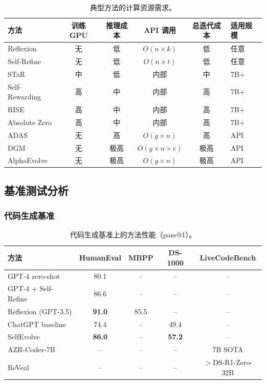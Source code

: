 \begin{table}[htbp]
\centering
\caption{典型方法的计算资源需求。}
\label{tab:compute-cost}
\begin{tabular}{lccccl}
\toprule
\textbf{方法} & \textbf{训练 GPU} & \textbf{推理成本} & \textbf{API 调用} & \textbf{总迭代成本} & \textbf{适用规模} \\
\midrule
Reflexion & 无 & 低 & $O(n \times k)$ & 低 & 任意 \\
Self-Refine & 无 & 低 & $O(n \times t)$ & 低 & 任意 \\
STaR & 中 & 低 & 内部 & 中 & 7B+ \\
Self-Rewarding & 高 & 中 & 内部 & 高 & 7B+ \\
RISE & 高 & 中 & 内部 & 高 & 7B+ \\
Absolute Zero & 高 & 中 & 内部 & 高 & 7B+ \\
ADAS & 无 & 高 & $O(g \times n)$ & 高 & API \\
DGM & 无 & 极高 & $O(g \times n \times e)$ & 极高 & API \\
AlphaEvolve & 无 & 极高 & $O(g \times n)$ & 极高 & API \\
\bottomrule
\end{tabular}
\end{table}

\subsection{基准测试分析}\label{sec:benchmarks}

\subsubsection{代码生成基准}

\begin{table}[htbp]
\centering
\caption{代码生成基准上的方法性能（pass@1）。}
\label{tab:code-benchmark}
\begin{tabular}{lcccc}
\toprule
\textbf{方法} & \textbf{HumanEval} & \textbf{MBPP} & \textbf{DS-1000} & \textbf{LiveCodeBench} \\
\midrule
GPT-4 zero-shot & 80.1 & -- & -- & -- \\
GPT-4 + Self-Refine & 86.6 & -- & -- & -- \\
Reflexion (GPT-3.5) & \textbf{91.0} & 85.5 & -- & -- \\
ChatGPT baseline & 74.4 & -- & 49.4 & -- \\
SelfEvolve & \textbf{86.0} & -- & \textbf{57.2} & -- \\
AZR-Coder-7B & -- & -- & -- & 7B SOTA \\
ReVeal & -- & -- & -- & $>$DS-R1-Zero-32B \\
\bottomrule
\end{tabular}
\end{table}

